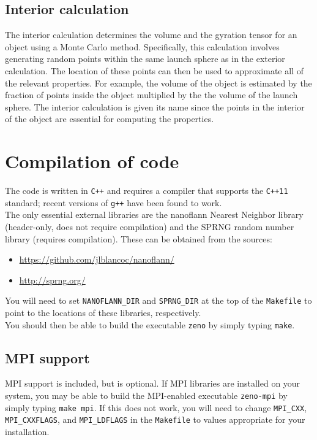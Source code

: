 \documentclass[12pt,letterpaper]{article}
\begin{document}
\subsection{Interior calculation}
The interior calculation determines the volume and the gyration tensor for an object using a Monte Carlo method. Specifically, this calculation involves generating random points within the same launch sphere as in the exterior calculation. The location of these points can then be used to approximate all of the relevant properties. For example, the volume of the object is estimated by the fraction of points inside the object multiplied by the the volume of the launch sphere. The interior calculation is given its name since the points in the interior of the object are essential for computing the properties.

\section{Compilation of code}

\noindent The code is written in \texttt{C++} and requires a compiler that supports the \texttt{C++11} standard; recent versions of \texttt{g++} have been found to work. \\

\noindent The only essential external libraries are the nanoflann Nearest Neighbor library (header-only, does not require compilation) and the SPRNG random number library (requires compilation).  These can be obtained from the sources:
\begin{itemize}
\item[] \url{https://github.com/jlblancoc/nanoflann/}
\item[] \url{http://sprng.org/}
\end{itemize}

\noindent You will need to set \verb'NANOFLANN_DIR' and \verb'SPRNG_DIR' at the top of the \texttt{Makefile} to point to the locations of these libraries, respectively. \\

\noindent You should then be able to build the executable \texttt{zeno} by simply typing \texttt{make}.

\subsection{MPI support}

\noindent MPI support is included, but is optional.  If MPI libraries are installed on your system, you may be able to build the MPI-enabled executable \texttt{zeno-mpi} by simply typing \texttt{make mpi}.  If this does not work, you will need to change \verb'MPI_CXX', \verb'MPI_CXXFLAGS', and \verb'MPI_LDFLAGS' in the \texttt{Makefile} to values appropriate for your installation.
\end{document}
